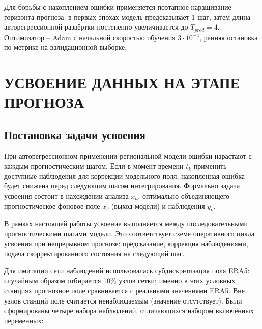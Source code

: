 \documentclass[14pt,a4paper]{extarticle}
\numberwithin{table}{section}
\numberwithin{figure}{section}
\numberwithin{equation}{section}
\begin{document}
Для борьбы с накоплением ошибки применяется поэтапное наращивание
горизонта прогноза: в первых эпохах модель предсказывает 1 шаг, затем
длина авторегрессионной развёртки постепенно увеличивается до
\(T_{pred} = 4\). Оптимизатор -- Adam с начальной скоростью обучения
\(3 \cdot 10^{-4}\), ранняя остановка по метрике на валидационной
выборке.


\newpage

\section{УСВОЕНИЕ ДАННЫХ НА ЭТАПЕ ПРОГНОЗА}\label{sec:da-inference}

\subsection{Постановка задачи усвоения}\label{ux43fux43eux441ux442ux430ux43dux43eux432ux43aux430-ux437ux430ux434ux430ux447ux438-ux443ux441ux432ux43eux435ux43dux438ux44f}

При авторегрессионном применении региональной модели ошибки нарастают с
каждым прогностическим шагом. Если в момент времени \(t_k\) применить
доступные наблюдения для коррекции модельного поля, накопленная ошибка
будет снижена перед следующим шагом интегрирования. Формально задача
усвоения состоит в нахождении анализа \(x_a\), оптимально
объединяющего прогностическое фоновое поле \(x_b\) (выход
модели) и наблюдения \(y_o\).

В рамках настоящей работы усвоение выполняется между
последовательными прогностическими шагами модели. Это соответствует схеме
оперативного цикла усвоения при непрерывном прогнозе:
предсказание, коррекция наблюдениями, подача скорректированного
состояния на следующий шаг.

Для имитации сети наблюдений использовалась субдискретизация поля ERA5: случайным образом отбирается
10\% узлов сетки; именно в этих условных станциях прогнозное
поле сравнивается с реальными значениями ERA5. Вне узлов станций поле
считается ненаблюдаемым (значение отсутствует). Были сформированы
четыре набора наблюдений, отличающихся набором включённых
переменных:
\end{document}
